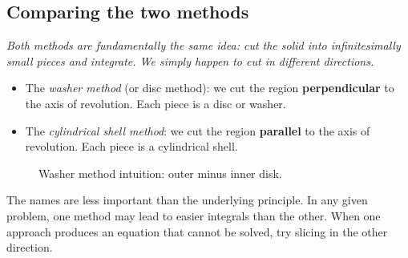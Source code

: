 \subsection*{Comparing the two methods}

\textit{Both methods are fundamentally the same idea: cut the solid into infinitesimally small pieces and integrate.  We simply happen to cut in different directions.}

\begin{definition}
\label{def:10-3}
\leavevmode
\begin{itemize}
  \item The \emph{washer method} (or disc method): we cut the region \textbf{perpendicular} to the axis of revolution.  Each piece is a disc or washer.
  \item The \emph{cylindrical shell method}: we cut the region \textbf{parallel} to the axis of revolution.  Each piece is a cylindrical shell.
\end{itemize}
\end{definition}

\begin{figure}[ht]
  \centering
  
  \caption{Washer method intuition: outer minus inner disk.}
  \label{fig:washer-method-slice}
\end{figure}

\begin{remark}
The names are less important than the underlying principle.  In any given problem, one method may lead to easier integrals than the other.  When one approach produces an equation that cannot be solved, try slicing in the other direction.
\end{remark}
